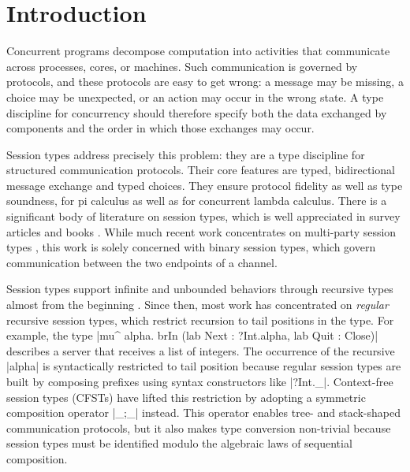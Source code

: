 
\section{Introduction}
\label{sec:introduction}

Concurrent programs decompose computation into activities that
communicate across processes, cores, or machines. Such communication is
governed by protocols, and these protocols are easy to get wrong: a
message may be missing, a choice may be unexpected, or an action may
occur in the wrong state. A type discipline for concurrency should
therefore specify both the data exchanged by components and the order
in which those exchanges may occur.

Session types
\cite{DBLP:conf/concur/Honda93,HondaVK98,Gay_Vasconcelos_2025}
address precisely this problem: they are a type discipline for
structured communication
protocols. Their core features are typed, bidirectional message
exchange and typed choices. They ensure protocol fidelity as well as type soundness,
for pi calculus as well as for concurrent lambda calculus. There is a significant body of
literature on session types, which is well appreciated in
survey articles and books
\cite{DBLP:journals/csur/HuttelLVCCDMPRT16,
  gay17:_behav_types,
  DBLP:journals/ftpl/AnconaBB0CDGGGH16,
  Gay_Vasconcelos_2025}.
While much recent work concentrates on multi-party session types
\cite{DBLP:journals/jacm/HondaYC16}, this work is solely concerned
with binary session types, which govern communication between the two endpoints
of a channel.

Session types support infinite and unbounded behaviors through
recursive types almost from the beginning \cite{HondaVK98}. Since
then, most work has concentrated on \emph{regular} recursive session
types, which restrict recursion to tail positions in the
type. For example, the type
|mu^ alpha. brIn (lab Next : ?Int.alpha, lab Quit : Close)|
describes a server that receives a list of integers. The occurrence of
the recursive |alpha| is syntactically restricted to tail
position because regular session types are built by composing prefixes
using syntax constructors like |?Int._|. Context-free session types
\cite{DBLP:conf/icfp/ThiemannV16,DBLP:journals/iandc/AlmeidaMTV22,DBLP:journals/toplas/Padovani19} (CFSTs)
have lifted this restriction by adopting a symmetric composition
operator |_;_| instead. This operator
enables tree- and stack-shaped communication protocols, but it also
makes type conversion non-trivial because session types must be
identified modulo the algebraic laws of sequential composition.

